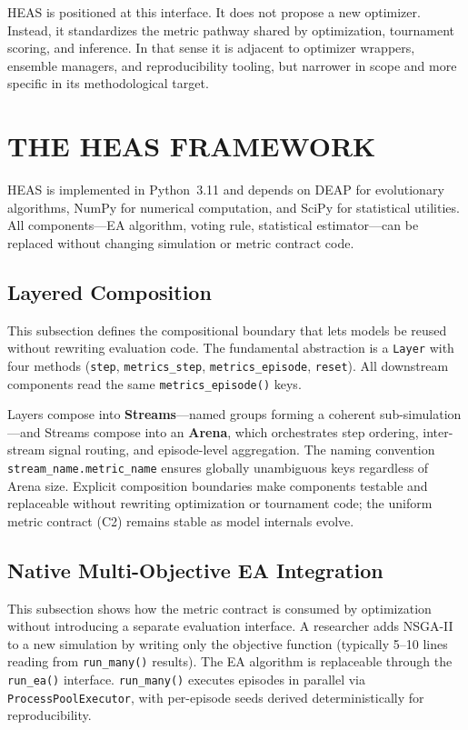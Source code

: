 \documentclass{wscpaperproc}
\begin{document}
HEAS is positioned at this interface. It does not propose a new optimizer.
Instead, it standardizes the metric pathway shared by optimization, tournament
scoring, and inference. In that sense it is adjacent to optimizer wrappers,
ensemble managers, and reproducibility tooling, but narrower in scope and more
specific in its methodological target.

\section{THE HEAS FRAMEWORK}

HEAS is implemented in Python~3.11 and depends on DEAP for evolutionary
algorithms, NumPy for numerical computation, and SciPy for statistical
utilities. All components---EA algorithm, voting rule, statistical
estimator---can be replaced without changing simulation or metric contract code.

\subsection{Layered Composition}

This subsection defines the compositional boundary that lets models be reused
without rewriting evaluation code. The fundamental abstraction is a
\texttt{Layer} with four methods
(\texttt{step}, \texttt{metrics\_step}, \texttt{metrics\_episode},
\texttt{reset}). All downstream components read the same
\texttt{metrics\_episode()} keys.

Layers compose into \textbf{Streams}---named groups forming a coherent
sub-simulation---and Streams compose into an \textbf{Arena}, which orchestrates
step ordering, inter-stream signal routing, and episode-level aggregation. The
naming convention \texttt{stream\_name.metric\_name} ensures globally unambiguous
keys regardless of Arena size. Explicit composition boundaries make components
testable and replaceable without rewriting optimization or tournament code;
the uniform metric contract (C2) remains stable as model internals evolve.

\subsection{Native Multi-Objective EA Integration}

This subsection shows how the metric contract is consumed by optimization
without introducing a separate evaluation interface. A researcher adds
NSGA-II to a new simulation by writing only the objective function (typically
5--10 lines reading from \texttt{run\_many()} results). The EA algorithm is
replaceable through the \texttt{run\_ea()} interface. \texttt{run\_many()}
executes episodes in parallel via \texttt{ProcessPoolExecutor}, with per-episode
seeds derived deterministically for reproducibility.
\end{document}
